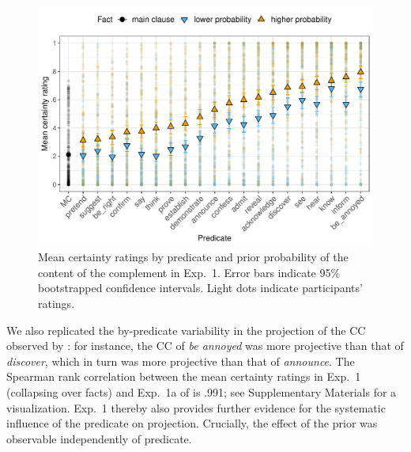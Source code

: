 \documentclass[OpenMind]{stjour}
\begin{document}
\begin{figure}[h!]
\centering

\includegraphics[width=\textwidth]{../../results/9-prior-projection/graphs/means-projectivity-by-predicate-and-prior}

\caption{Mean certainty ratings by predicate and prior probability of the content of the complement in Exp.~1. Error bars indicate 95\% bootstrapped confidence intervals. Light dots indicate participants' ratings.} 
\label{f-projection-mean}
\end{figure}

We also replicated the by-predicate variability in the projection of the CC observed by \cite{tonhauser-degen-factive}: for instance, the CC of {\em be annoyed} was more projective than that of {\em discover}, which in turn was more projective than that of {\em announce}. The Spearman rank correlation between the mean certainty ratings in Exp.~1 (collapsing over facts) and Exp.~1a of \cite{tonhauser-degen-factive} is  .991; see Supplementary Materials for a visualization. Exp.~1 thereby also provides further evidence for the systematic influence of the predicate on projection. Crucially, the effect of the prior was observable independently of predicate.
\end{document}
